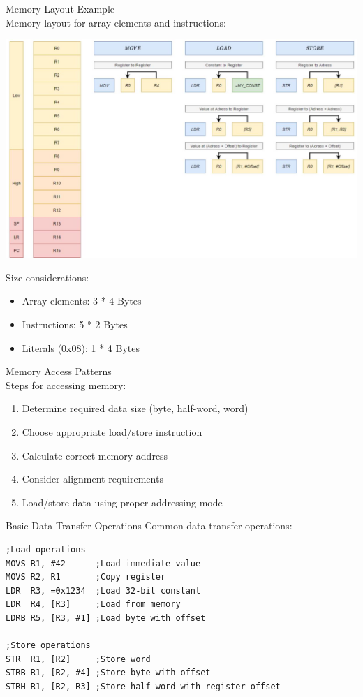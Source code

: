 \begin{example2}{Memory Layout Example}\\
Memory layout for array elements and instructions:

\includegraphics[width=\linewidth]{images/2024_12_29_79e6b22f503fb7b4f718g-03}
\end{example2}
\begin{remark}
Size considerations:
\begin{itemize}
  \item Array elements: 3 * 4 Bytes
  \item Instructions: 5 * 2 Bytes
  \item Literals (0x08): 1 * 4 Bytes
\end{itemize}
\end{remark}

\begin{KR}{Memory Access Patterns}\\
Steps for accessing memory:
\begin{enumerate}
  \item Determine required data size (byte, half-word, word)
  \item Choose appropriate load/store instruction
  \item Calculate correct memory address
  \item Consider alignment requirements
  \item Load/store data using proper addressing mode
\end{enumerate}
\end{KR}

\begin{example2}{Basic Data Transfer Operations}
Common data transfer operations:
\begin{lstlisting}[language=armasm, style=basesmol]
;Load operations
MOVS R1, #42      ;Load immediate value
MOVS R2, R1       ;Copy register
LDR  R3, =0x1234  ;Load 32-bit constant
LDR  R4, [R3]     ;Load from memory
LDRB R5, [R3, #1] ;Load byte with offset

;Store operations
STR  R1, [R2]     ;Store word
STRB R1, [R2, #4] ;Store byte with offset
STRH R1, [R2, R3] ;Store half-word with register offset
\end{lstlisting}
\end{example2}